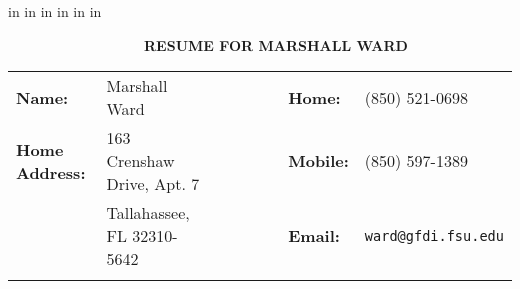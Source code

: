 \documentclass[10pt, letterpaper]{article}
\begin{document}
 in
 in
 in
 in
 in
 in

\begin{center}
{\large \verb|                   |\textbf{RESUME FOR MARSHALL WARD}}
\end{center}

\begin{tabular}{llll}
\\
\bf{Name:}         & Marshall Ward                & \ \ \ \ \ \ \ \ \ \bf{Home:}      & (850) 521-0698\\
\bf{Home Address:} & 163 Crenshaw Drive, Apt. 7   & \ \ \ \ \ \ \ \ \ \bf{Mobile:}    & (850) 597-1389 \\
                   & Tallahassee, FL 32310-5642   & \ \ \ \ \ \ \ \ \ \bf{Email:}     & \verb|ward@gfdi.fsu.edu| \\
\\
\end{tabular}
\end{document}
